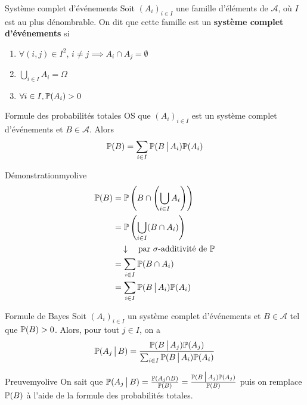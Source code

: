     \begin{defi}{Système complet d’événements}{}
        Soit $(A_i)_{i \in I}$ une famille d’éléments de $\mathcal{A}$, où $I$ est au plus dénombrable. On dit que cette famille est un \textbf{système complet d’événements} si 
        \begin{enumerate}
            \item $\forall (i,j) \in I^2$, $i \neq j \implies A_i \cap A_j = \emptyset$
            \item $\bigcup_{i \in I} A_i = \Omega$
            \item $\forall i \in I, \P(A_i) > 0$
        \end{enumerate}
    \end{defi}

    \begin{prop}{Formule des probabilités totales}{}
        OS que $(A_i)_{i \in I}$ est un système complet d’événements et $B \in \mathcal{A}$. Alors 
        \[ \P(B) = \sum_{i \in I} \P(B \vbar A_i) \P(A_i) \]    
    \end{prop}

    \begin{demo}{Démonstration}{myolive}
        \begin{align*}
            \P(B) 
            &= \P\left(B \cap \left(\bigcup_{i \in I} A_i\right)\right) \\
            &= \P\left(\bigcup_{i \in I} (B \cap A_i)\right) \\
            &\argu \text{par } \sigma\text{-additivité de } \P \\
            &= \sum_{i \in I} \P(B \cap A_i) \\
            &= \sum_{i \in I} \P(B \vbar A_i) \P(A_i)
        \end{align*}
    \end{demo}

    \begin{prop}{Formule de Bayes}{}
        Soit $(A_i)_{i \in I}$ un système complet d’événements et $B \in \mathcal{A}$ tel que $\P(B) > 0$. Alors, pour tout $j \in I$, on a 
        \[ \P(A_j \vbar B) = \frac{\P(B \vbar A_j) \P(A_j)}{\sum_{i \in I} \P(B \vbar A_i) \P(A_i)} \]    
    \end{prop}

    \begin{demo}{Preuve}{myolive}
        On sait que $\P(A_j \vbar B) = \frac{\P(A_j \cap B)}{\P(B)} = \frac{\P(B \vbar A_j)\P(A_j)}{\P(B)}$ puis on remplace $\P(B)$ à l’aide de la formule des probabilités totales.
    \end{demo}


